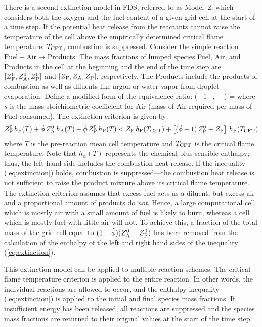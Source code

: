 There is a second extinction model in FDS, referred to as Model~2, which considers both the oxygen and the fuel content of a given grid cell at the start of a time step. If the potential heat release from the reactants cannot raise the temperature of the cell above the empirically determined critical flame temperature, $T_{\rm CFT}$, combustion is suppressed.  Consider the simple reaction $\mbox{Fuel} + \mbox{Air} \rightarrow \mbox{Products}$. The mass fractions of lumped species Fuel, Air, and Products in the cell at the beginning and the end of the time step are $[Z_{\rm F}^0, Z_{\rm A}^0, Z_{\rm P}^0]$ and $[Z_{\rm F}, Z_{\rm A}, Z_{\rm P}]$, respectively. The Products include the products of combustion as well as diluents like argon or water vapor from droplet evaporation. Define a modified form of the equivalence ratio:
\be
   \label{eq:dza}
   \tilde{\phi} \equiv  \min \left( \, 1 \, , \,  \, \right) = 
\ee
where $s$ is the mass stoichiometric coefficient for Air (mass of Air required per mass of Fuel consumed). The extinction criterion is given by:
\begin{align}
\label{eq:extinction}
Z_{\rm F}^0 \, h_{\rm F}(T) + \tilde{\phi} \, Z_{\rm A}^0 \, h_{\rm A}(T) + \tilde{\phi} \, Z_{\rm P}^0 \, h_{\rm P}(T) <
Z_{\rm F} \, h_{\rm F}(T_{\rm CFT}) + \left[ (\tilde{\phi}-1) \, Z_{\rm P}^0 + Z_{\rm P} \right] \, h_{\rm P}(T_{\rm CFT})
\end{align}
where $T$ is the pre-reaction mean cell temperature and $T_{\rm CFT}$ is the critical flame temperature. Note that $h_\alpha(T)$ represents the chemical plus sensible enthalpy; thus, the left-hand-side includes the combustion heat release.  If the inequality (\ref{eq:extinction}) holds, combustion is suppressed---the combustion heat release is not sufficient to raise the product mixture above its critical flame temperature. The extinction criterion assumes that excess fuel acts as a diluent, but excess air and a proportional amount of products do \emph{not}. Hence, a large computational cell which is mostly air with a small amount of fuel is likely to burn, whereas a cell which is mostly fuel with little air will not. To achieve this, a fraction of the total mass of the grid cell equal to $(1-\tilde{\phi}) (Z_{\rm A}^0+Z_{\rm P}^0)$ has been removed from the calculation of the enthalpy of the left and right hand sides of the inequality (\ref{eq:extinction}).

This extinction model can be applied to multiple reaction schemes. The critical flame temperature criterion is applied to the entire reaction. In other words, the individual reactions are allowed to occur, and the enthalpy inequality (\ref{eq:extinction}) is applied to the initial and final species mass fractions. If insufficient energy has been released, all reactions are suppressed and the species mass fractions are returned to their original values at the start of the time step.


